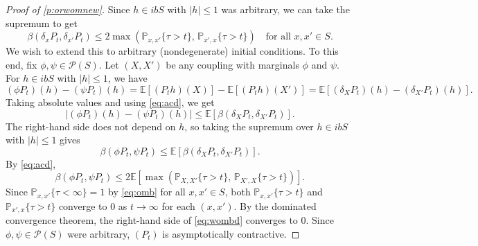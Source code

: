 \documentclass[12pt,reqno]{amsart}
\numberwithin{equation}{section}
\theoremstyle{definition}
\newcommand{\1}{\mathbbm{1}}
\newcommand{\PP}{\mathbb P}
\newcommand{\EE}{\mathbb E}
\newcommand{\pP}{\mathscr{P}}
\begin{document}
\begin{proof}[Proof of \cref{p:orwomnew}]
    Since $h \in ibS$ with $|h| \leq 1$ was arbitrary, we can take the supremum to get
    \begin{equation}\label{eq:acd}
        \beta(\delta_x P_t , \delta_{x'} P_t) \leq 2 \max(\PP_{x,x'} \{\tau > t\},\, \PP_{x',x} \{\tau > t\})
        \quad \text{for all } x,x' \in S.
    \end{equation}
    We wish to extend this to arbitrary (nondegenerate) initial conditions.
    To this end, fix $\phi, \psi \in \pP(S)$. Let $(X, X')$ be any coupling with marginals
    $\phi$ and $\psi$. For $h \in ibS$ with $|h| \leq 1$, we have
    \begin{equation*}
        (\phi P_t)(h) - (\psi P_t)(h)
        = \EE[(P_t h)(X)] - \EE[(P_t h)(X')]
        = \EE[(\delta_X P_t)(h) - (\delta_{X'} P_t)(h)].
    \end{equation*}
    Taking absolute values and using \eqref{eq:acd}, we get
    \begin{equation*}
        |(\phi P_t)(h) - (\psi P_t)(h)| \leq \EE[\beta(\delta_X P_t, \delta_{X'} P_t)].
    \end{equation*}
    The right-hand side does not depend on $h$, so taking the supremum over $h \in ibS$ with $|h| \leq 1$ gives
    \begin{equation*}
        \beta(\phi P_t, \psi P_t) \leq \EE[\beta(\delta_X P_t, \delta_{X'} P_t)].
    \end{equation*}
    By \eqref{eq:acd},
    \begin{equation}\label{eq:wombd}
        \beta(\phi P_t, \psi P_t) \leq 2\EE[\max(\PP_{X,X'}\{\tau > t\},\, \PP_{X',X}\{\tau > t\})].
    \end{equation}
    Since $\PP_{x,x'}\{\tau < \infty\} = 1$ by \eqref{eq:omb} for all $x, x' \in S$,
    both $\PP_{x,x'}\{\tau > t\}$ and $\PP_{x',x}\{\tau > t\}$ converge to $0$
    as $t \to \infty$ for each $(x,x')$.
    By the dominated convergence theorem, the right-hand side of
    \eqref{eq:wombd} converges to $0$.
    Since $\phi, \psi \in \pP(S)$ were arbitrary, $(P_t)$ is asymptotically
    contractive.
\end{proof}
\end{document}
